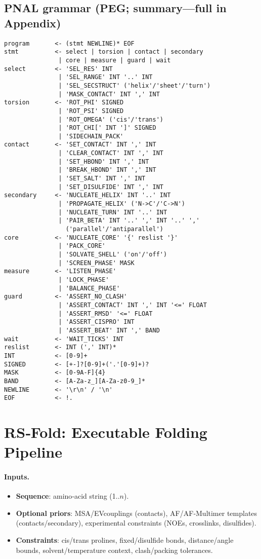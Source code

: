 \documentclass[12pt,a4paper]{article}
\begin{document}
\subsection{PNAL grammar (PEG; summary—full in Appendix)}
\begin{verbatim}
program       <- (stmt NEWLINE)* EOF
stmt          <- select | torsion | contact | secondary
               | core | measure | guard | wait
select        <- 'SEL_RES' INT
               | 'SEL_RANGE' INT '..' INT
               | 'SEL_SECSTRUCT' ('helix'/'sheet'/'turn')
               | 'MASK_CONTACT' INT ',' INT
torsion       <- 'ROT_PHI' SIGNED
               | 'ROT_PSI' SIGNED
               | 'ROT_OMEGA' ('cis'/'trans')
               | 'ROT_CHI[' INT ']' SIGNED
               | 'SIDECHAIN_PACK'
contact       <- 'SET_CONTACT' INT ',' INT
               | 'CLEAR_CONTACT' INT ',' INT
               | 'SET_HBOND' INT ',' INT
               | 'BREAK_HBOND' INT ',' INT
               | 'SET_SALT' INT ',' INT
               | 'SET_DISULFIDE' INT ',' INT
secondary     <- 'NUCLEATE_HELIX' INT '..' INT
               | 'PROPAGATE_HELIX' ('N->C'/'C->N')
               | 'NUCLEATE_TURN' INT '..' INT
               | 'PAIR_BETA' INT '..' ',' INT '..' ','
                 ('parallel'/'antiparallel')
core          <- 'NUCLEATE_CORE' '{' reslist '}'
               | 'PACK_CORE'
               | 'SOLVATE_SHELL' ('on'/'off')
               | 'SCREEN_PHASE' MASK
measure       <- 'LISTEN_PHASE'
               | 'LOCK_PHASE'
               | 'BALANCE_PHASE'
guard         <- 'ASSERT_NO_CLASH'
               | 'ASSERT_CONTACT' INT ',' INT '<=' FLOAT
               | 'ASSERT_RMSD' '<=' FLOAT
               | 'ASSERT_CISPRO' INT
               | 'ASSERT_BEAT' INT ',' BAND
wait          <- 'WAIT_TICKS' INT
reslist       <- INT (',' INT)*
INT           <- [0-9]+
SIGNED        <- [+-]?[0-9]+('.'[0-9]+)?
MASK          <- [0-9A-F]{4}
BAND          <- [A-Za-z_][A-Za-z0-9_]*
NEWLINE       <- '\r\n' / '\n'
EOF           <- !.
\end{verbatim}

\section{RS‑Fold: Executable Folding Pipeline}

\paragraph{Inputs.}
\begin{itemize}
  \item \textbf{Sequence}: amino‑acid string (1..$n$).
  \item \textbf{Optional priors}: MSA/EVcouplings (contacts), AF/AF‑Multimer templates (contacts/secondary), experimental constraints (NOEs, crosslinks, disulfides).
  \item \textbf{Constraints}: cis/trans prolines, fixed/disulfide bonds, distance/angle bounds, solvent/temperature context, clash/packing tolerances.
\end{itemize}
\end{document}
